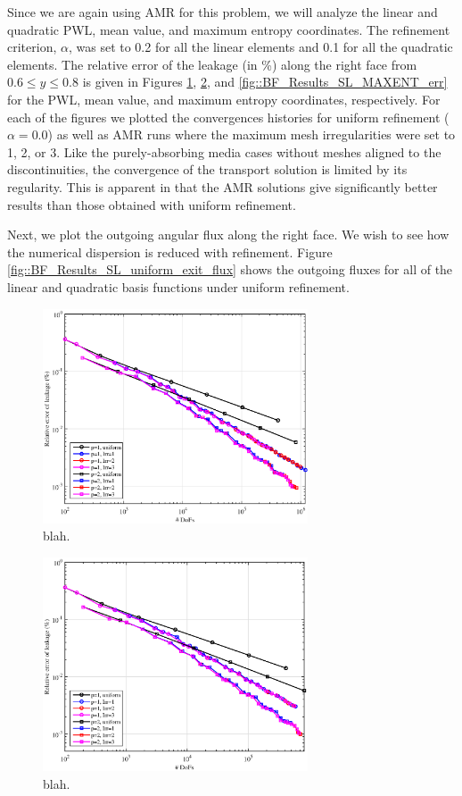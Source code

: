 Since we are again using AMR for this problem, we will analyze the linear and quadratic PWL, mean value, and maximum entropy coordinates. The refinement criterion, $\alpha$, was set to 0.2 for all the linear elements and 0.1 for all the quadratic elements. The relative error of the leakage (in \%) along the right face from $0.6 \leq y \leq 0.8$ is given in Figures \ref{fig::BF_Results_SL_PWL_err}, \ref{fig::BF_Results_SL_MV_err}, and \ref{fig::BF_Results_SL_MAXENT_err} for the PWL, mean value, and maximum entropy coordinates, respectively. For each of the figures we plotted the convergences histories for uniform refinement ($\alpha = 0.0$) as well as AMR runs where the maximum mesh irregularities were set to 1, 2, or 3. Like the purely-absorbing media cases without meshes aligned to the discontinuities, the convergence of the transport solution is limited by its regularity. This is apparent in that the AMR solutions give significantly better results than those obtained with uniform refinement. 

Next, we plot the outgoing angular flux along the right face. We wish to see how the numerical dispersion is reduced with refinement. Figure \ref{fig::BF_Results_SL_uniform_exit_flux} shows the outgoing fluxes for all of the linear and quadratic basis functions under uniform refinement.

\begin{figure}
\centering
\includegraphics[width=0.70\textwidth]{figures/sec_BF/SL_PWL_Err.eps}
\caption{blah.}
\label{fig::BF_Results_SL_PWL_err}
\end{figure}

\begin{figure}
\centering
\includegraphics[width=0.70\textwidth]{figures/sec_BF/SL_MV_Err.eps}
\caption{blah.}
\label{fig::BF_Results_SL_MV_err}
\end{figure}

